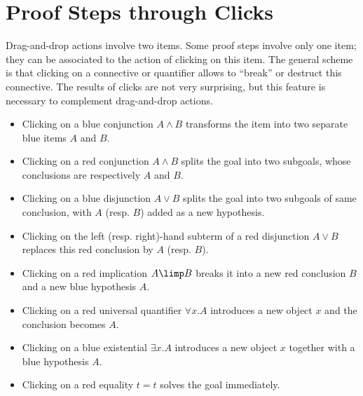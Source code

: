 \section{Proof Steps through Clicks}
Drag-and-drop actions involve two items. Some proof steps involve only
one item; they can be associated to the action of clicking on this
item. The general scheme is that clicking on a connective or quantifier
allows to ``break'' or destruct this connective. The results of clicks
are not very surprising, but this feature is necessary to complement
drag-and-drop actions.
\begin{itemize}
\item Clicking on a blue conjunction $A\land B$ transforms the
    item into two separate blue items $A$ and $B$.
\item Clicking on a red conjunction $A\land B$ splits the goal into
    two subgoals, whose conclusions are respectively $A$ and $B$.
\item Clicking on a blue disjunction $A\lor B$ splits the goal into two subgoals
    of same conclusion, with $A$ (resp. $B$) added as a new hypothesis.
\item Clicking on the left (resp. right)-hand subterm of a red
      disjunction $A\lor B$ replaces this red conclusion by $A$
      (resp. $B$).
\item Clicking on a red implication $A\limp B$ breaks it into a
      new red conclusion $B$ and a new blue hypothesis $A$.
\item Clicking on a red universal quantifier $\forall x.A$ introduces
  a new object $x$ and the conclusion becomes $A$.
\item Clicking on a blue existential $\exists x.A$ introduces a new
  object $x$ together with a blue hypothesis $A$.
\item Clicking on a red equality $t = t$ solves the goal immediately.
\end{itemize}

